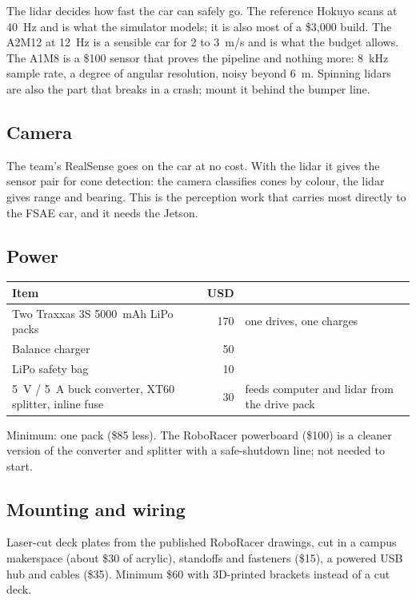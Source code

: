 \documentclass[11pt,a4paper]{article}
\begin{document}
\smallskip
The lidar decides how fast the car can safely go. The reference Hokuyo scans at 40~Hz and is
what the simulator models; it is also most of a \$3{,}000 build. The A2M12 at 12~Hz is a
sensible car for 2 to 3~m/s and is what the budget allows. The A1M8 is a \$100 sensor that
proves the pipeline and nothing more: 8~kHz sample rate, a degree of angular resolution,
noisy beyond 6~m. Spinning lidars are also the part that breaks in a crash; mount it behind
the bumper line.

\subsection{Camera}

The team's RealSense goes on the car at no cost. With the lidar it gives the sensor pair for
cone detection: the camera classifies cones by colour, the lidar gives range and bearing. This
is the perception work that carries most directly to the FSAE car, and it needs the Jetson.

\subsection{Power}

\begin{tabularx}{\linewidth}{Xrl}
\toprule
Item & USD & \\
\midrule
Two Traxxas 3S 5000~mAh LiPo packs & 170 & one drives, one charges \\
Balance charger & 50 & \\
LiPo safety bag & 10 & \\
5~V / 5~A buck converter, XT60 splitter, inline fuse & 30 & feeds computer and lidar from the drive pack \\
\bottomrule
\end{tabularx}

\smallskip
Minimum: one pack (\$85 less). The RoboRacer powerboard (\$100) is a cleaner version of the
converter and splitter with a safe-shutdown line; not needed to start.

\subsection{Mounting and wiring}

Laser-cut deck plates from the published RoboRacer drawings, cut in a campus makerspace
(about \$30 of acrylic), standoffs and fasteners (\$15), a powered USB hub and cables (\$35).
Minimum \$60 with 3D-printed brackets instead of a cut deck.
\end{document}
